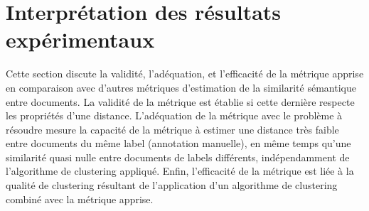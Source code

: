 
\section{Interprétation des résultats expérimentaux}
\label{sec:similarite:experimentations}
Cette section discute la validité, l'adéquation, et l'efficacité de la métrique apprise en comparaison avec d'autres métriques d'estimation de la similarité sémantique entre documents. La validité de la métrique est établie si cette dernière respecte les propriétés d'une distance. L'adéquation de la métrique avec le problème à résoudre mesure la capacité de la métrique à estimer une distance très faible entre documents du même label (annotation manuelle), en même temps qu'une similarité quasi nulle entre documents de labels différents, indépendamment de l'algorithme de clustering appliqué. Enfin, l'efficacité de la métrique est liée à la qualité de clustering résultant de l'application d'un algorithme de clustering combiné avec la métrique apprise.


